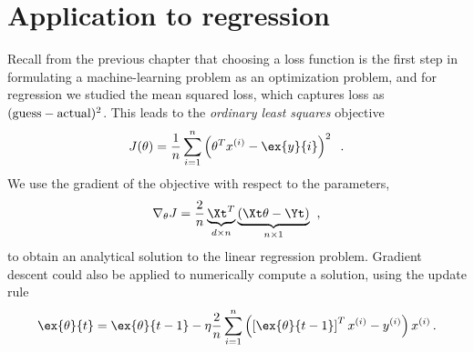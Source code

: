 



\section{Application to regression}

\label{sec-gd_ridge}

Recall from the previous chapter that choosing a loss function is the
first step in formulating a machine-learning problem as an
optimization problem, and for regression we studied the mean squared
loss, which captures loss as
$({\rm guess} - {\rm actual})^2$.
This leads to the {\em ordinary least squares} objective
\begin{equation}
  J(\theta) = \frac{1}{n}\sum_{i =
    1}^n\left(\theta^Tx^{(i)} - \ex{y}{i}\right)^2 \;\;.
\end{equation}
We use the gradient of the objective with respect to the parameters,
\begin{equation}
  \nabla_{\theta}J = \frac{2}{n}\underbrace{\Xt^T}_{d \times
    n}\underbrace{(\Xt\theta - \Yt)}_{n \times 1}\;\;,
  \label{eq:reg_gd_deriv}
\end{equation}
to obtain an
analytical solution to the linear regression problem.  Gradient
descent could also be applied to numerically compute a solution, using
the update rule
\begin{equation}
  \ex{\theta}{t} = \ex{\theta}{t-1} - \eta \frac{2}{n} \sum_{i=1}^{n} \left( \left[ \ex{\theta}{t-1}\right]^T x^{(i)} - y^{(i)} \right) x^{(i)}
  \,.
\end{equation}
{~\hfill ~}

